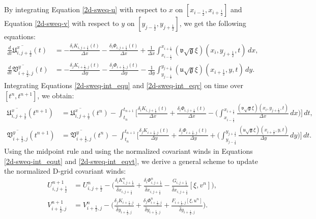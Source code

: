 By integrating Equation \eqref{2d-sweq-u} with respect to $x$ on $[x_{i-\frac{1}{2}},x_{i+\frac{1}{2}}]$ and Equation \eqref{2d-sweq-v} with respect to $y$ on $[y_{j-\frac{1}{2}},y_{j+\frac{1}{2}}]$, we get the following equations:
\begin{align}
	\label{2d-sweq-int_equ}
	\frac{d}{dt}\overline{\mathfrak{U}^x_{i,j+\frac{1}{2}}}
	(t)&= -\frac{\delta_i K_{i,j+\frac{1}{2}}(t)}{\Delta x}-\frac{\delta_i \Phi_{i,j+\frac{1}{2}}(t)}{\Delta x} + 
	\frac{1}{\Delta x}
	\int_{x_{i-\frac{1}{2}}}^{x_{i+\frac{1}{2}}}
	(\mathfrak{v}\sqrt{\mathfrak{g}}\xi)(x_i, y_{j+\frac{1}{2}}, t) \,dx, \\
	\label{2d-sweq-int_eqv}
	\frac{d}{dt} \overline{\mathfrak{V}^y_{i+\frac{1}{2},j}}(t)&= -\frac{\delta_j K_{i+\frac{1}{2},j}(t)}{\Delta y}-
	\frac{\delta_j \Phi_{i+\frac{1}{2},j}(t)}{\Delta y}
	- \frac{1}{\Delta y}
	\int_{y_{j-\frac{1}{2}}}^{y_{j+\frac{1}{2}}} 
	(\mathfrak{u}\sqrt{\mathfrak{g}}\xi)(x_{i+\frac{1}{2}}, y, t) \,dy.
\end{align}
Integrating Equations \eqref{2d-sweq-int_equ} and \eqref{2d-sweq-int_eqv} on time over $[t^n,t^{n+1}]$, we obtain:
\begin{align}
	\label{2d-sweq-int_equt}
	\overline{\mathfrak{U}^x_{i,j+\frac{1}{2}}}(t^{n+1})&=
	\overline{\mathfrak{U}^x_{i,j+\frac{1}{2}}}(t^{n}) -
	\int_{t_{n}}^{t_{n+1}}\bigg[
	\frac{\delta_i K_{i,j+\frac{1}{2}}(t)}{\Delta x}
	+\frac{\delta_i \Phi_{i,j+\frac{1}{2}}(t)}{\Delta x} - \bigg(
	\int_{x_{i-\frac{1}{2}}}^{x_{i+\frac{1}{2}}}
	\frac{(\mathfrak{v}\sqrt{\mathfrak{g}}\xi)(x_i, y_{j+\frac{1}{2}}, t)}{\Delta x}
	\,dx \bigg)\bigg]
	\,dt ,\\
	\label{2d-sweq-int_eqvt}
	\overline{\mathfrak{V}^y_{i+\frac{1}{2},j}}(t^{n+1})&=
	\overline{\mathfrak{V}^y_{i+\frac{1}{2},j}}(t^{n}) -
	\int_{t_{n}}^{t_{n+1}}\bigg[
	\frac{\delta_j K_{i+\frac{1}{2},j}(t)}{\Delta y}+\frac{\delta_j\Phi_{i+\frac{1}{2},j}(t)}{\Delta y}+ \bigg(
	\int_{y_{j-\frac{1}{2}}}^{y_{j+\frac{1}{2}}} 
	\frac{(\mathfrak{u}\sqrt{\mathfrak{g}}\xi)(x_{i+\frac{1}{2}}, y, t)}{\Delta y}
	\,dy \bigg)\bigg]\,dt .
\end{align}
Using the midpoint rule and using the normalized covariant winds in Equations \eqref{2d-sweq-int_equt} and \eqref{2d-sweq-int_eqvt}, we derive a general scheme
to update the normalized D-grid covariant winds:
\begin{align}
	\label{2d-sweq-dscheme-u}
	{U}_{i,j+\frac{1}{2}}^{n+1}&=
	{U}_{i,j+\frac{1}{2}}^{n} - \bigg(
	\frac{\delta_i K_{i,j+\frac{1}{2}}^n}{\hat{\delta} x_{i,j+\frac{1}{2}}}
	+\frac{\delta_i \Phi_{i,j+\frac{1}{2}}^n}{\hat{\delta} x_{i,j+\frac{1}{2}}}
	- \frac{G_{i,j+\frac{1}{2}}}{{\hat{\delta} x_{i,j+\frac{1}{2}}}}[\xi, v^n]\bigg)
	,\\
	\label{2d-sweq-dscheme-v}
	{V}_{i+\frac{1}{2},j}^{n+1}&=
	{V}_{i+\frac{1}{2},j}^{n} - \bigg(
	\frac{\delta_j K_{i+\frac{1}{2},j}}{\hat{\delta} y_{i+\frac{1}{2},j}}+
	\frac{\delta_j \Phi_{{i+\frac{1}{2}},j}^n}{\hat{\delta} y_{i+\frac{1}{2},j}}
	+ \frac{F_{i+\frac{1}{2},j}[\xi, u^n]}{\hat{\delta} y_{i+\frac{1}{2},j}} \bigg).
\end{align}
